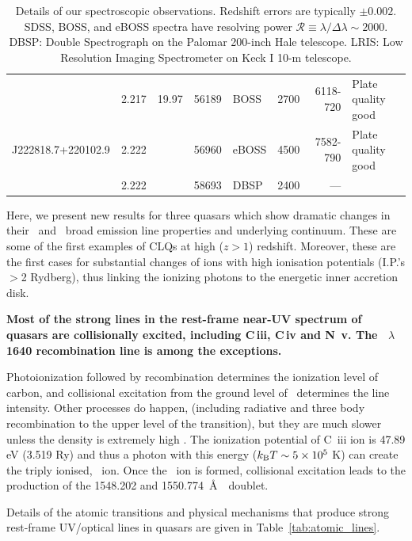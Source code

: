 \documentclass[fleqn,usenatbib]{mnras}
\begin{document}
\begin{table}
\begin{tabular}{l l   r ll  r r l}
                                      & 2.217                               & 19.97          &  56189                    &  BOSS                                    &  2700            &   6118-720          & Plate quality good \\
 J222818.7+220102.9   & 2.222                               &                    &  56960                     & eBOSS                                    &  4500            &   7582-790          & Plate quality good \\ 
                                     &  2.222                               &                    &  58693                    &  DBSP                                    & 2400             &    ---                        &    \\
    \hline \hline   
  \end{tabular}
  \caption{Details of our spectroscopic observations.  Redshift errors are
    typically $\pm 0.002$.  SDSS, BOSS, and eBOSS spectra have
    resolving power $\mathcal{R} \equiv \lambda / \Delta \lambda \sim 2000$.  DBSP: Double Spectrograph on the Palomar
    200-inch Hale telescope.  LRIS: Low Resolution Imaging Spectrometer on Keck
    I 10-m telescope.} 
  \label{tab:obs_notes}
\end{table}

Here, we present new results for three quasars which show dramatic
changes in their \civ\ and \ciii\ broad emission line properties and
underlying continuum. These are some of the first examples of CLQs at
high ($z>1$) redshift. Moreover, these are the first cases for
substantial changes of ions with high ionisation potentials (I.P.'s
$>$2 Rydberg), thus linking the ionizing photons to the energetic
inner accretion disk.

{\bf 
 Most of the strong lines in the rest-frame near-UV spectrum of quasars are
collisionally excited, including C\,{\sc iii}, C\,{\sc iv} and N\,{\sc
v}.  The \heii~$\lambda$1640 recombination line is among the exceptions.

Photoionization followed by recombination determines the ionization
level of carbon, and collisional excitation from the ground level of
\civ\ determines the line intensity. Other processes do happen,
(including radiative and three body recombination to the upper level
of the transition), but they are much slower unless the density is
extremely high \citep[e.g., ][and H. Netzer,
priv. comm.]{Dopita_Sutherland2003book}. The ionization potential of C\,{\sc
iii} ion is 47.89 eV (3.519 Ry) and thus a photon with this energy
($k_{\rm B} T \sim 5 \times10^{5}$ K) can create the triply ionised,
\civ\ ion. Once the \civ\ ion is formed, collisional excitation leads to
the production of the 1548.202 and 1550.774~\AA\ \civ\ doublet.
}
Details of the atomic transitions and physical mechanisms that produce
strong rest-frame UV/optical lines in quasars are given in
Table~\ref{tab:atomic_lines}.
\end{document}
